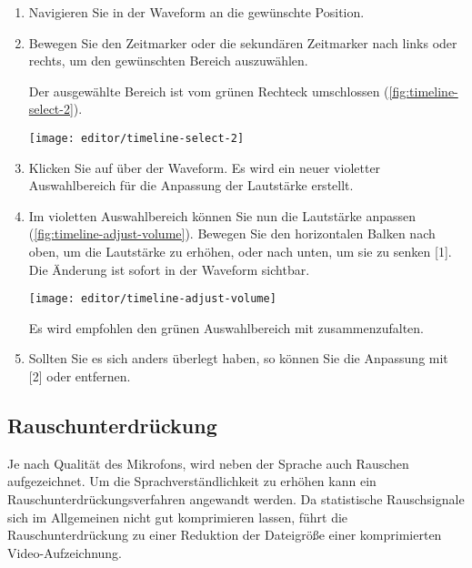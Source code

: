 \begin{enumerate}
	\item Navigieren Sie in der Waveform an die gewünschte Position.
	\item Bewegen Sie den Zeitmarker \editorslider{} oder die sekundären Zeitmarker \editorsecondarysliderleft{}\editorsecondarysliderright{} nach links oder rechts, um den gewünschten Bereich auszuwählen.

	Der ausgewählte Bereich ist vom grünen Rechteck umschlossen (\autoref{fig:timeline-select-2}).

	\begin{minipage}{0.9\textwidth}
		\centering
		\captionsetup{type=figure}
		\texttt{[image: editor/timeline-select-2]}
		\label{fig:timeline-select-2}
	\end{minipage}

	\item Klicken Sie auf  \editoradjustvolume{} über der Waveform. Es wird ein neuer violetter Auswahlbereich für die Anpassung der Lautstärke erstellt.
	
	\item Im violetten Auswahlbereich können Sie nun die Lautstärke anpassen (\autoref{fig:timeline-adjust-volume}). Bewegen Sie den horizontalen Balken nach oben, um die Lautstärke zu erhöhen, oder nach unten, um sie zu senken [1]. Die Änderung ist sofort in der Waveform sichtbar.

	\begin{minipage}{0.9\textwidth}
		\centering
		\captionsetup{type=figure}
		\texttt{[image: editor/timeline-adjust-volume]}
		\label{fig:timeline-adjust-volume}
	\end{minipage}

	\begin{note}
		Es wird empfohlen den grünen Auswahlbereich mit \editorcollapseselection{} zusammenzufalten.
	\end{note}

	\item Sollten Sie es sich anders überlegt haben, so können Sie die Anpassung mit  [2] oder \editorundo{} entfernen.
\end{enumerate}


\subsection{Rauschunterdrückung}
Je nach Qualität des Mikrofons, wird neben der Sprache auch Rauschen aufgezeichnet. Um die Sprachverständlichkeit zu erhöhen kann ein Rauschunterdrückungsverfahren angewandt werden. Da statistische Rauschsignale sich im Allgemeinen nicht gut komprimieren lassen, führt die Rauschunterdrückung zu einer Reduktion der Dateigröße einer komprimierten Video-Aufzeichnung.

